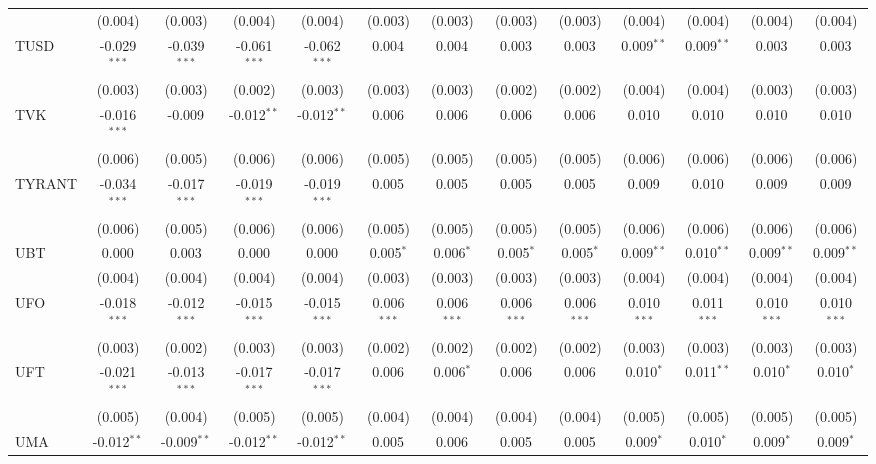 \begin{table}[!htbp]
\begin{tabular}{@{\extracolsep{5pt}}lcccccccccccc}
  & (0.004) & (0.003) & (0.004) & (0.004) & (0.003) & (0.003) & (0.003) & (0.003) & (0.004) & (0.004) & (0.004) & (0.004) \\
 TUSD & -0.029$^{***}$ & -0.039$^{***}$ & -0.061$^{***}$ & -0.062$^{***}$ & 0.004$^{}$ & 0.004$^{}$ & 0.003$^{}$ & 0.003$^{}$ & 0.009$^{**}$ & 0.009$^{**}$ & 0.003$^{}$ & 0.003$^{}$ \\
  & (0.003) & (0.003) & (0.002) & (0.003) & (0.003) & (0.003) & (0.002) & (0.002) & (0.004) & (0.004) & (0.003) & (0.003) \\
 TVK & -0.016$^{***}$ & -0.009$^{}$ & -0.012$^{**}$ & -0.012$^{**}$ & 0.006$^{}$ & 0.006$^{}$ & 0.006$^{}$ & 0.006$^{}$ & 0.010$^{}$ & 0.010$^{}$ & 0.010$^{}$ & 0.010$^{}$ \\
  & (0.006) & (0.005) & (0.006) & (0.006) & (0.005) & (0.005) & (0.005) & (0.005) & (0.006) & (0.006) & (0.006) & (0.006) \\
 TYRANT & -0.034$^{***}$ & -0.017$^{***}$ & -0.019$^{***}$ & -0.019$^{***}$ & 0.005$^{}$ & 0.005$^{}$ & 0.005$^{}$ & 0.005$^{}$ & 0.009$^{}$ & 0.010$^{}$ & 0.009$^{}$ & 0.009$^{}$ \\
  & (0.006) & (0.005) & (0.006) & (0.006) & (0.005) & (0.005) & (0.005) & (0.005) & (0.006) & (0.006) & (0.006) & (0.006) \\
 UBT & 0.000$^{}$ & 0.003$^{}$ & 0.000$^{}$ & 0.000$^{}$ & 0.005$^{*}$ & 0.006$^{*}$ & 0.005$^{*}$ & 0.005$^{*}$ & 0.009$^{**}$ & 0.010$^{**}$ & 0.009$^{**}$ & 0.009$^{**}$ \\
  & (0.004) & (0.004) & (0.004) & (0.004) & (0.003) & (0.003) & (0.003) & (0.003) & (0.004) & (0.004) & (0.004) & (0.004) \\
 UFO & -0.018$^{***}$ & -0.012$^{***}$ & -0.015$^{***}$ & -0.015$^{***}$ & 0.006$^{***}$ & 0.006$^{***}$ & 0.006$^{***}$ & 0.006$^{***}$ & 0.010$^{***}$ & 0.011$^{***}$ & 0.010$^{***}$ & 0.010$^{***}$ \\
  & (0.003) & (0.002) & (0.003) & (0.003) & (0.002) & (0.002) & (0.002) & (0.002) & (0.003) & (0.003) & (0.003) & (0.003) \\
 UFT & -0.021$^{***}$ & -0.013$^{***}$ & -0.017$^{***}$ & -0.017$^{***}$ & 0.006$^{}$ & 0.006$^{*}$ & 0.006$^{}$ & 0.006$^{}$ & 0.010$^{*}$ & 0.011$^{**}$ & 0.010$^{*}$ & 0.010$^{*}$ \\
  & (0.005) & (0.004) & (0.005) & (0.005) & (0.004) & (0.004) & (0.004) & (0.004) & (0.005) & (0.005) & (0.005) & (0.005) \\
 UMA & -0.012$^{**}$ & -0.009$^{**}$ & -0.012$^{**}$ & -0.012$^{**}$ & 0.005$^{}$ & 0.006$^{}$ & 0.005$^{}$ & 0.005$^{}$ & 0.009$^{*}$ & 0.010$^{*}$ & 0.009$^{*}$ & 0.009$^{*}$ \\

\end{tabular}
\end{table}
